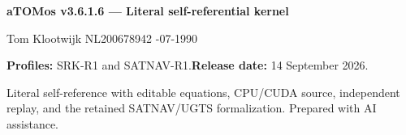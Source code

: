 \documentclass[11pt,a4paper]{article}
\begin{document}
\normalsize
\vfill
\begin{panel}
\textbf{aTOMos v3.6.1.6 --- Literal self-referential kernel}\par
Tom Klootwijk \quad NL200678942 -07-1990\par
\textbf{Profiles:} SRK-R1 and SATNAV-R1.\quad\textbf{Release date:} 14 September 2026.\par
Literal self-reference with editable equations, CPU/CUDA source, independent replay,
and the retained SATNAV/UGTS formalization. Prepared with AI assistance.
\end{panel}
\end{document}
